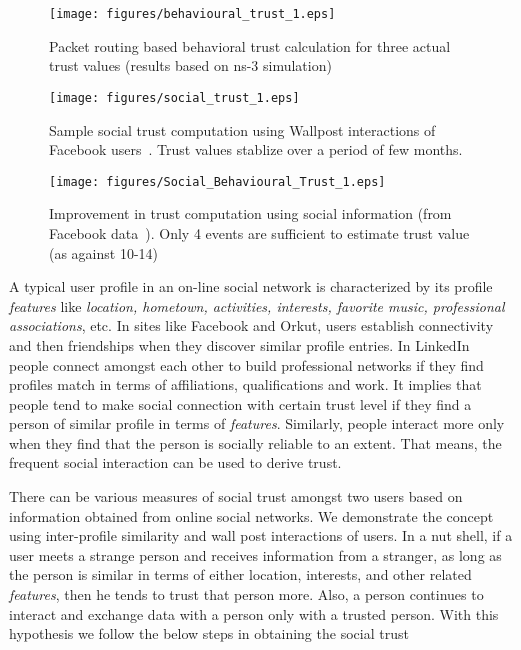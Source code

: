 \documentclass[conference]{IEEEtran}
\begin{document}
\begin{figure*}[t]
\hspace{-0.15in}
\begin{minipage}[b]{0.33\linewidth}
	\centering
		\texttt{[image: figures/behavioural\_trust\_1.eps]}
\caption{Packet routing based behavioral trust calculation for three actual trust values (results based on ns-3 simulation)}
\label{behavioral_routing_r1}
\end{minipage}
\hspace{0.5cm}
\begin{minipage}[b]{0.33\linewidth}
	\centering
		\texttt{[image: figures/social\_trust\_1.eps]}
\caption{Sample social trust computation using Wallpost interactions of Facebook users~\cite{Viswanath:2009}. Trust values stablize over a period of few months.}
\label{social_r1}
	\end{minipage}
\begin{minipage}[b]{0.33\linewidth}

	\centering
		\texttt{[image: figures/Social\_Behavioural\_Trust\_1.eps]}
\caption{Improvement in trust computation using social information (from Facebook data~\cite{Viswanath:2009}). Only 4 events are sufficient to estimate trust value (as against 10-14)}
\label{fig:social_behavioural_comparison}
	\end{minipage}
\end{figure*}







A typical user profile in an on-line social network is characterized by its profile {\it features} like {\it location, hometown, activities, interests, favorite music, professional associations}, etc. In sites like Facebook and Orkut, users establish connectivity and then friendships when they discover similar profile entries. In LinkedIn people connect amongst each other to build professional networks if they find profiles match in terms of affiliations, qualifications and work. It implies that people tend to make social connection with certain trust level if they find a person of similar profile in terms of {\it features}. Similarly, people interact more only when they find that the person is socially reliable to an extent. That means, the frequent social interaction can be used to derive trust.

There can be various measures of social trust amongst two users based on information obtained from online social networks. We demonstrate the concept using inter-profile similarity and wall post interactions of users. In a nut shell, if a user meets a strange person and receives information from a stranger, as long as the person is similar in terms of either location, interests, and other related {\it features}, then he tends to trust that person more. Also, a person continues to interact and exchange data with a person only with a trusted person.
With this hypothesis we follow the below steps in obtaining the social trust
\end{document}
